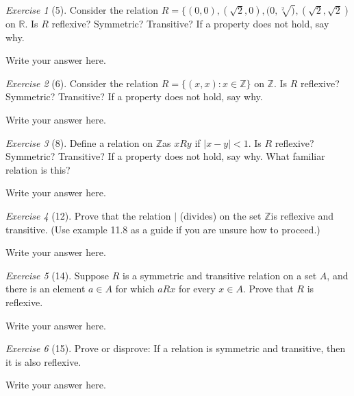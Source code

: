 \documentclass[12pt]{amsart}
\makeatletter
\theoremstyle{remark}
\newtheorem*{exercise}{Exercise}%
\def\RR{\ensuremath{\mathbb R}}
\def\ZZ{\ensuremath{\mathbb Z}}
\renewenvironment{proof}[1][\proofname]{\par\doublespacing
  \pushQED{\qed}%
  \normalfont \topsep6\p@\@plus6\p@\relax
  \list{}{%
    \settowidth{\leftmargin}{\itshape\proofname:\hskip\labelsep}%
    \setlength{\labelwidth}{0pt}%
    \setlength{\itemindent}{-\leftmargin}%
  }%
  \item[\hskip\labelsep\itshape#1\@addpunct{:}]\ignorespaces
}{%
  \popQED\endlist\@endpefalse
  \singlespacing
}
\theoremstyle{mycomment}
\makeatother
\begin{document}
\begin{exercise}[5] Consider the relation $R=\{(0,0),(\sqrt{2},0),(0,\sqrt[2]),(\sqrt{2},\sqrt{2})$ on $\RR$. Is $R$ reflexive? Symmetric? Transitive? If a property does not hold, say why.
\begin{proof}[Solution]
Write your answer here.
\end{proof}
\end{exercise}

\begin{exercise}[6] Consider the relation $R=\{(x,x):x\in\ZZ\}$ on \ZZ. Is $R$ reflexive? Symmetric? Transitive? If a property does not hold, say why.
\begin{proof}[Solution]
Write your answer here.
\end{proof}
\end{exercise}

\begin{exercise}[8] Define a relation on \ZZ as $xRy$ if $|x-y|<1$. Is $R$ reflexive? Symmetric? Transitive? If a property does not hold, say why. What familiar relation is this?
\begin{proof}[Solution]
Write your answer here.
\end{proof}
\end{exercise}

\begin{exercise}[12] Prove that the relation $|$ (divides) on the set \ZZ is reflexive and transitive. (Use example 11.8 as a guide if you are unsure how to proceed.)
\begin{proof}[Solution]
Write your answer here.
\end{proof}
\end{exercise}

\begin{exercise}[14] Suppose $R$ is a symmetric and transitive relation on a set $A$, and there is an element $a\in A$ for which $aRx$ for every $x\in A$. Prove that $R$ is reflexive.
\begin{proof}
Write your answer here.
\end{proof}
\end{exercise}

\begin{exercise}[15] Prove or disprove: If a relation is symmetric and transitive, then it is also reflexive.
\begin{proof}[Solution]
Write your answer here.
\end{proof}
\end{exercise}
\end{document}
